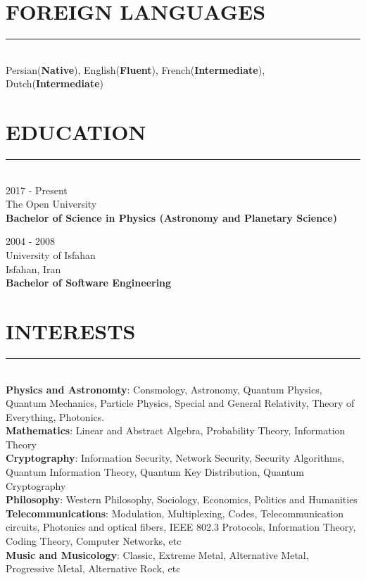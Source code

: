 \documentclass[10pt,a4paper]{article}
\begin{document}

\section{FOREIGN LANGUAGES}
\noindent \rule {18.0cm}{0.2pt} \\
    Persian(\textbf{Native}),
    English(\textbf{Fluent}),
    French(\textbf{Intermediate}),
    Dutch(\textbf{Intermediate})

\section{EDUCATION}
\noindent \rule {18.0cm}{0.2pt} \\
\textbullet \hspace{0.1cm} 2017 - Present \\
The Open University \\
\textbf{Bachelor of Science in Physics (Astronomy and Planetary Science)}
\vspace{0.3cm}

\noindent \textbullet \hspace{0.1cm}  2004 - 2008 \\
University of Isfahan \\
Isfahan, Iran \\
\textbf{Bachelor of Software Engineering}


\section{INTERESTS}
\noindent \rule {18.0cm}{0.2pt} \\
\textbullet \hspace{0.1cm} \textbf{Physics and Astronomty}: Consmology, Astronomy, Quantum Physics, Quantum Mechanics, Particle Physics, Special and General Relativity, Theory of Everything, Photonics. \\
\textbullet \hspace{0.1cm} \textbf{Mathematics}: Linear and Abstract Algebra, Probability Theory, Information Theory \\
\textbullet \hspace{0.1cm} \textbf{Cryptography}: Information Security, Network Security, Security Algorithms, Quantum Information Theory, Quantum Key Distribution, Quantum Cryptography \\
\textbullet \hspace{0.1cm} \textbf{Philosophy}: Western Philosophy, Sociology, Economics, Politics and Humanities \\
\textbullet \hspace{0.1cm} \textbf{Telecommunications}: Modulation, Multiplexing, Codes, Telecommunication circuits, Photonics and optical fibers, IEEE 802.3 Protocols, Information Theory, Coding Theory, Computer Networks, etc \\
\textbullet \hspace{0.1cm} \textbf{Music and Musicology}: Classic, Extreme Metal, Alternative Metal, Progressive Metal, Alternative Rock, etc
\end{document}
